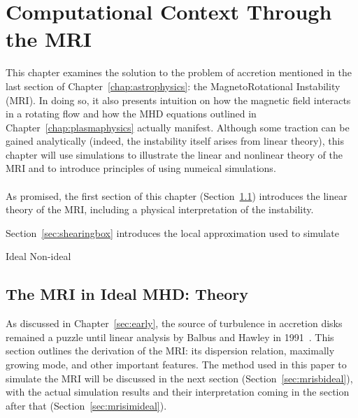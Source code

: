 \chapter{Computational Context Through the MRI} \label{chap:compMRI}
This chapter examines the solution to the problem of accretion mentioned in the last section of Chapter~\ref{chap:astrophysics}: the MagnetoRotational Instability (MRI). In doing so, it also presents intuition on how the magnetic field interacts in a rotating flow and how the MHD equations outlined in Chapter~\ref{chap:plasmaphysics} actually manifest. Although some traction can be gained analytically (indeed, the instability itself arises from linear theory), this chapter will use simulations to illustrate the linear and nonlinear theory of the MRI and to introduce principles of using numeical simulations. \\
\\
As promised, the first section of this chapter (Section~\ref{sec:mriLinear}) introduces the linear theory of the MRI, including a physical interpretation of the instability. 


Section~\ref{sec:shearingbox} introduces the local approximation used to simulate 

Ideal
Non-ideal


\section{The MRI in Ideal MHD: Theory} \label{sec:mriLinear}
As discussed in Chapter~\ref{sec:early}, the source of turbulence in accretion disks remained a puzzle until linear analysis by Balbus and Hawley in 1991~\cite{BH1991}. This section outlines the derivation of the MRI: its dispersion relation, maximally growing mode, and other important features. The method used in this paper to simulate the MRI will be discussed in the next section (Section~\ref{sec:mrisbideal}), with the actual simulation results and their interpretation coming in the section after that (Section~\ref{sec:mrisimideal}).

